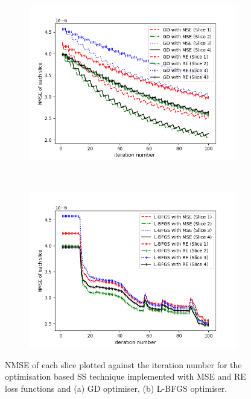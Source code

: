 \begin{figure}[H]
	\centering
	\begin{subfigure}[t]{0.8\textwidth}
		\centering
		\includegraphics[trim={20 5 40 40}, clip, width=\textwidth]{ss/Each_slice_GD.png}
		\caption{}
		\label{fig:SS_Each_slice_GD}
	\end{subfigure}
	\\
	\begin{subfigure}[t]{0.8\textwidth}
		\centering
		\includegraphics[trim={20 5 40 40}, clip, width=\textwidth]{ss/Each_slice_LBFGS.png}
		\caption{}
		\label{fig:SS_Each_slice_LBFGS}
	\end{subfigure}

	\caption{NMSE of each slice plotted against the iteration number for the optimisation based SS technique implemented with MSE and RE loss functions and (a) GD optimiser, (b) L-BFGS optimiser.}
	\label{fig:SS_Each_slice_Optim}
\end{figure}

